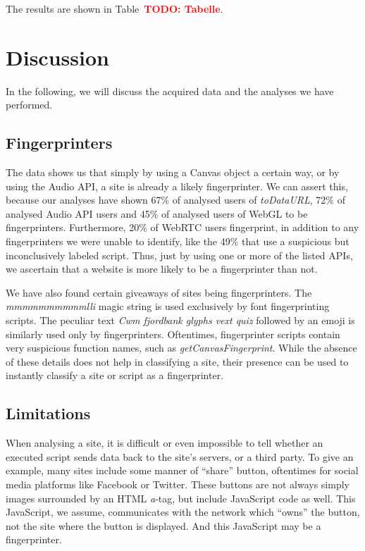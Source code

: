 \documentclass[
    fontsize=12pt,
    headings=small,
    parskip=half,
    bibliography=totoc,
    numbers=noenddot,
    open=any
    ]{scrreprt}
\newcommand{\todo}[1]{\textcolor{red}{\textbf{TODO: #1}}}
\begin{document}
The results are shown in Table~\todo{Tabelle}.


\section{Discussion}
In the following, we will discuss the acquired data and the analyses we have performed.

\subsection{Fingerprinters}
The data shows us that simply by using a Canvas object a certain way, or by using the Audio API,
a site is already a likely fingerprinter. We can assert this, because our analyses have shown
67\% of analysed users of \textit{toDataURL}, 72\% of analysed Audio API users and 45\%
of analysed users of WebGL to be fingerprinters.
Furthermore, 20\% of WebRTC users fingerprint, in addition to any fingerprinters we were unable
to identify, like the 49\% that use a suspicious but inconclusively labeled script.
Thus, just by using one or more of the listed APIs, we ascertain that a website is more likely
to be a fingerprinter than not.

We have also found certain giveaways of sites being fingerprinters.
The \textit{mmmmmmmmmmlli} magic string is used exclusively by font fingerprinting scripts.
The peculiar text \textit{Cwm fjordbank glyphs vext quiz} followed by an emoji is similarly used only
by fingerprinters.
Oftentimes, fingerprinter scripts contain very suspicious function names, such as \textit{getCanvasFingerprint}.
While the absence of these details does not help in classifying a site,
their presence can be used to instantly classify a site or script as a fingerprinter.


\subsection{Limitations}
When analysing a site, it is difficult or even impossible to tell whether an executed
script sends data back to the site's servers, or a third party.
To give an example, many sites include some manner of ``share'' button,
oftentimes for social media platforms like Facebook or Twitter.
These buttons are not always simply images surrounded by an HTML \textit{a}-tag,
but include JavaScript code as well.
This JavaScript, we assume, communicates with the network which ``owns''
the button, not the site where the button is displayed.
And this JavaScript may be a fingerprinter.
\end{document}
